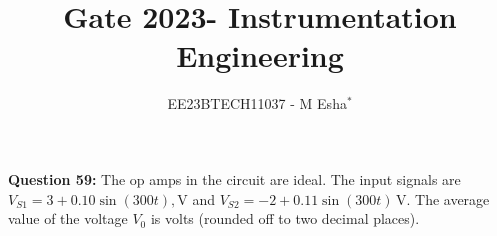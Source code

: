 \documentclass[journal,12pt,twocolumn]{IEEEtran}
\theoremstyle{remark}
\begin{document}

\vspace{3cm}

\title{Gate 2023- Instrumentation Engineering}
\author{EE23BTECH11037 - M Esha$^{*}$%
}
\maketitle
\newpage
\bigskip

\renewcommand{\thefigure}{\theenumi}
\renewcommand{\thetable}{\theenumi}

\vspace{3cm}
\textbf{Question 59:} 
The op amps in the circuit are ideal. The input signals are $V_{S1} = 3 + 0.10 \sin(300t), \text{V}$ and $V_{S2} = -2 + 0.11 \sin(300t)\, \text{V}$. The average value of the voltage $V_0$ is \underline{\hspace{1cm}} volts (rounded off to two decimal places).
\end{document}
